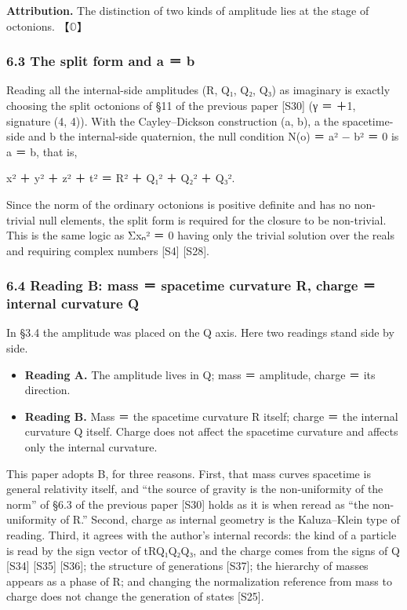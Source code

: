 \documentclass[
  a4paper,
]{article}
\providecommand{\tightlist}{%
  \setlength{\itemsep}{0pt}\setlength{\parskip}{0pt}}
\begin{document}
\textbf{Attribution.} The distinction of two kinds of amplitude lies at
the stage of octonions. 【\(\mathbb{O}\)】

\subsubsection{6.3 The split form and \textbar a\textbar{} ＝
\textbar b\textbar{}}\label{the-split-form-and-a-b}

Reading all the internal-side amplitudes (R, Q₁, Q₂, Q₃) as imaginary is
exactly choosing the split octonions of §11 of the previous paper
{[}S30{]} (γ ＝ ＋1, signature (4, 4)). With the Cayley--Dickson
construction (a, b), a the spacetime-side and b the internal-side
quaternion, the null condition N(o) ＝ \textbar a\textbar² −
\textbar b\textbar² ＝ 0 is \textbar a\textbar{} ＝ \textbar b\textbar,
that is,

x² ＋ y² ＋ z² ＋ t² ＝ R² ＋ Q₁² ＋ Q₂² ＋ Q₃².

Since the norm of the ordinary octonions is positive definite and has no
non-trivial null elements, the split form is required for the closure to
be non-trivial. This is the same logic as Σxₙ² ＝ 0 having only the
trivial solution over the reals and requiring complex numbers {[}S4{]}
{[}S28{]}.

\subsubsection{6.4 Reading B: mass ＝ spacetime curvature R, charge ＝
internal curvature
Q}\label{reading-b-mass-spacetime-curvature-r-charge-internal-curvature-q}

In §3.4 the amplitude was placed on the Q axis. Here two readings stand
side by side.

\begin{itemize}
\tightlist
\item
  \textbf{Reading A.} The amplitude lives in Q; mass ＝ amplitude,
  charge ＝ its direction.
\item
  \textbf{Reading B.} Mass ＝ the spacetime curvature R itself; charge
  ＝ the internal curvature Q itself. Charge does not affect the
  spacetime curvature and affects only the internal curvature.
\end{itemize}

This paper adopts B, for three reasons. First, that mass curves
spacetime is general relativity itself, and ``the source of gravity is
the non-uniformity of the norm'' of §6.3 of the previous paper {[}S30{]}
holds as it is when reread as ``the non-uniformity of R.'' Second,
charge as internal geometry is the Kaluza--Klein type of reading. Third,
it agrees with the author's internal records: the kind of a particle is
read by the sign vector of tRQ₁Q₂Q₃, and the charge comes from the signs
of Q {[}S34{]} {[}S35{]} {[}S36{]}; the structure of generations
{[}S37{]}; the hierarchy of masses appears as a phase of R; and changing
the normalization reference from mass to charge does not change the
generation of states {[}S25{]}.
\end{document}
